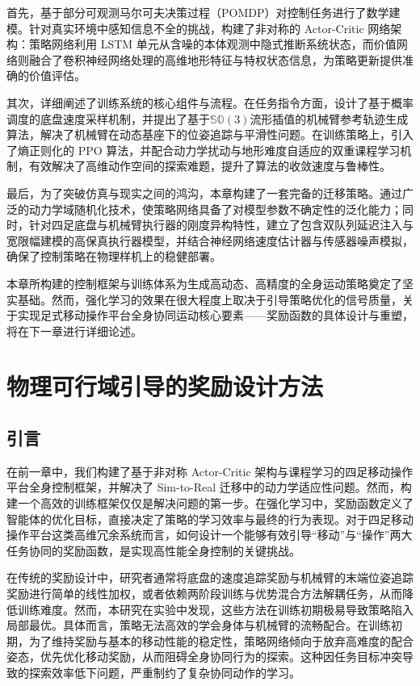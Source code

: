 首先，基于部分可观测马尔可夫决策过程（POMDP）对控制任务进行了数学建模。针对真实环境中感知信息不全的挑战，构建了非对称的 Actor-Critic 网络架构：策略网络利用 LSTM 单元从含噪的本体观测中隐式推断系统状态，而价值网络则融合了卷积神经网络处理的高维地形特征与特权状态信息，为策略更新提供准确的价值评估。

其次，详细阐述了训练系统的核心组件与流程。在任务指令方面，设计了基于概率调度的底盘速度采样机制，并提出了基于$\mathbb{SO}(3)$流形插值的机械臂参考轨迹生成算法，解决了机械臂在动态基座下的位姿追踪与平滑性问题。在训练策略上，引入了熵正则化的 PPO 算法，并配合动力学扰动与地形难度自适应的双重课程学习机制，有效解决了高维动作空间的探索难题，提升了算法的收敛速度与鲁棒性。

最后，为了突破仿真与现实之间的鸿沟，本章构建了一套完备的迁移策略。通过广泛的动力学域随机化技术，使策略网络具备了对模型参数不确定性的泛化能力；同时，针对四足底盘与机械臂执行器的刚度异构特性，建立了包含双队列延迟注入与宽限幅建模的高保真执行器模型，并结合神经网络速度估计器与传感器噪声模拟，确保了控制策略在物理样机上的稳健部署。

本章所构建的控制框架与训练体系为生成高动态、高精度的全身运动策略奠定了坚实基础。然而，强化学习的效果在很大程度上取决于引导策略优化的信号质量，关于实现足式移动操作平台全身协同运动核心要素——奖励函数的具体设计与重塑，将在下一章进行详细论述。

\chapter{物理可行域引导的奖励设计方法}
\section{引言}
在前一章中，我们构建了基于非对称 Actor-Critic 架构与课程学习的四足移动操作平台全身控制框架，并解决了 Sim-to-Real 迁移中的动力学适应性问题。然而，构建一个高效的训练框架仅仅是解决问题的第一步。在强化学习中，奖励函数定义了智能体的优化目标，直接决定了策略的学习效率与最终的行为表现。对于四足移动操作平台这类高维冗余系统而言，如何设计一个能够有效引导“移动”与“操作”两大任务协同的奖励函数，是实现高性能全身控制的关键挑战。

在传统的奖励设计中，研究者通常将底盘的速度追踪奖励与机械臂的末端位姿追踪奖励进行简单的线性加权，或者依赖两阶段训练与优势混合方法解耦任务，从而降低训练难度。然而，本研究在实验中发现，这些方法在训练初期极易导致策略陷入局部最优。具体而言，策略无法高效的学会身体与机械臂的流畅配合。在训练初期，为了维持奖励与基本的移动性能的稳定性，策略网络倾向于放弃高难度的配合姿态，优先优化移动奖励，从而阻碍全身协同行为的探索。这种因任务目标冲突导致的探索效率低下问题，严重制约了复杂协同动作的学习。

